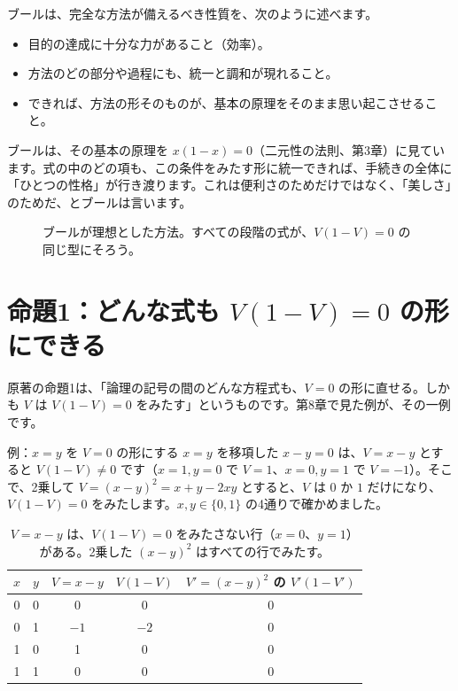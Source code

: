 \documentclass[a4paper,11pt,openany]{ltjsbook}
\begin{document}
ブールは、完全な方法が備えるべき性質を、次のように述べます。

\begin{itemize}[leftmargin=*]
\item 目的の達成に十分な力があること（効率）。
\item 方法のどの部分や過程にも、統一と調和が現れること。
\item できれば、方法の形そのものが、基本の原理をそのまま思い起こさせること。
\end{itemize}

ブールは、その基本の原理を $x(1-x)=0$（二元性の法則、第3章）に見ています。式の中のどの項も、この条件をみたす形に統一できれば、手続きの全体に「ひとつの性格」が行き渡ります。これは便利さのためだけではなく、「美しさ」のためだ、とブールは言います。

\begin{figure}[htbp]
\centering
{}
\caption{ブールが理想とした方法。すべての段階の式が、$V(1-V)=0$ の同じ型にそろう。}
\end{figure}

\section{命題1：どんな式も $V(1-V)=0$ の形にできる}

原著の命題1は、「論理の記号の間のどんな方程式も、$V=0$ の形に直せる。しかも $V$ は $V(1-V)=0$ をみたす」というものです。第8章で見た例が、その一例です。

\begin{examplebox}{例：$x=y$ を $V=0$ の形にする}
$x=y$ を移項した $x-y=0$ は、$V=x-y$ とすると $V(1-V)\ne0$ です（$x=1,y=0$ で $V=1$、$x=0,y=1$ で $V=-1$）。そこで、2乗して $V=(x-y)^2=x+y-2xy$ とすると、$V$ は $0$ か $1$ だけになり、$V(1-V)=0$ をみたします。$x,y\in\{0,1\}$ の4通りで確かめました。
\end{examplebox}

\begin{table}[htbp]
\centering
\begin{tabular}{cc|cc|c}
\toprule
$x$ & $y$ & $V=x-y$ & $V(1-V)$ & $V'=(x-y)^2$ の $V'(1-V')$\\
\midrule
0 & 0 & 0 & 0 & 0\\
0 & 1 & $-1$ & $-2$ & 0\\
1 & 0 & 1 & 0 & 0\\
1 & 1 & 0 & 0 & 0\\
\bottomrule
\end{tabular}
\caption{$V=x-y$ は、$V(1-V)=0$ をみたさない行（$x=0$、$y=1$）がある。2乗した $(x-y)^2$ はすべての行でみたす。}
\end{table}
\end{document}

